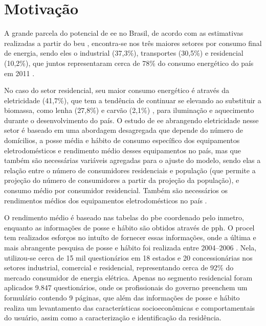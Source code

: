 \section{Motivação}

A grande parcela do potencial de \gls{ee} no Brasil, de acordo com as
estimativas realizadas a partir do \gls{beu} \cite{beu}, encontra-se nos três
maiores setores por consumo final de energia, sendo eles o industrial (37,3\%), 
transportes (30,5\%) e residencial (10,2\%), que juntos representaram cerca 
de 78\% do consumo energético do país em 2011 \cite{ben2012,epe_eficiencia_2012}.

No caso do setor residencial, seu maior consumo energético é através da
eletricidade (41,7\%), que tem a tendência de continuar se elevando ao
substituir a biomassa, como lenha (27,8\%) e carvão (2,1\%) \cite{ben2012},
para iluminação e aquecimento durante o desenvolvimento do país. O estudo de 
\gls{ee} abrangendo eletricidade nesse setor é baseado em uma abordagem desagregada 
que depende do número de domícilios, a posse média e hábito de consumo específico 
dos equipamentos eletrodomésticos e rendimento médio desses equipamentos no país, 
mas que também são necessárias variáveis agregadas para o ajuste do modelo, 
sendo elas a relação entre o número de consumidores residenciais e população 
(que permite a projeção do número de consumidores a partir da projeção da população), 
e consumo médio por consumidor residencial. Também são necessários os
rendimentos médios dos equipamentos eletrodomésticos no país
\cite{epe_eficiencia_2012}. 

O rendimento médio é baseado nas tabelas do \gls{pbe} coordenado pelo \gls{inmetro}, 
enquanto as informações de posse e hábito são obtidos através de \gls{pph}. 
O \gls{procel} tem realizados esforços no intuíto de fornecer essas informações, 
onde a última e mais abrangente pesquisa de posse e hábito foi realizada entre 2004--2006 
\cite{result_procel_2005,site_pesquisas_procel}. Nela, utilizou-se cerca de 15 mil 
questionários em 18 estados e 20 concessionárias nos setores 
industrial, comercial e residencial, representando cerca de 92\% do 
mercado consumidor de energia elétrica. Apenas no segmento residencial foram
aplicados 9.847 questionários, onde os profissionais do governo preenchem um
formulário contendo 9 páginas, que além das informações de posse e hábito
realiza um levantamento das características socioeconômicas e comportamentais do
usuário, assim como a caracterização e identificação da residência.

